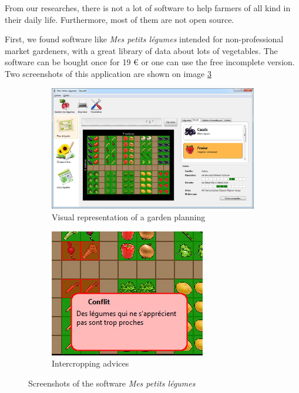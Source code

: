 From our researches, there is not a lot of software to help farmers of all kind in their daily life. Furthermore, most of them are not open source.

First, we found software like \emph{Mes petits légumes}\cite{mespetitslegumes} intended for non-professional market gardeners, with a great library of data about lots of vegetables. The software can be bought once for 19 \euro{} or one can use the free incomplete version. Two screenshots of this application are shown on image \ref{fig:mespetitslegumes}

\begin{figure}
\centering
\begin{subfigure}{.5\textwidth}
  \centering
  \includegraphics[width=0.9\linewidth]{images/petitslegumes1.jpg}
  \caption{Visual representation of a garden planning}
  \label{fig:petitslegumes1}
\end{subfigure}%
\begin{subfigure}{.5\textwidth}
  \centering
  \includegraphics[width=0.7\linewidth]{images/petitslegumes2.jpg}
  \caption{Intercropping advices}
  \label{fig:petitslegumes2}
\end{subfigure}
\caption{Screenshots of the software \emph{Mes petits légumes}}
\label{fig:mespetitslegumes}
\end{figure}



